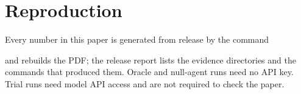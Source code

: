 \section{Reproduction}

Every number in this paper is generated from release  by the command
\begin{center}\end{center}
and  rebuilds the PDF; the release report  lists the evidence directories and the commands that produced them.
Oracle and null-agent runs need no API key.
Trial runs need model API access and are not required to check the paper.
